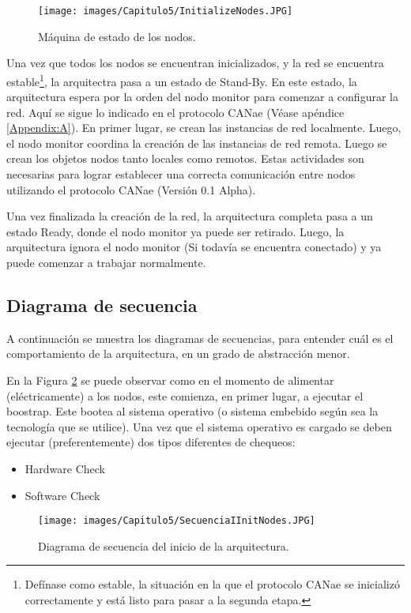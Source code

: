\begin{figure}[h!]
 \centering
 \texttt{[image: images/Capitulo5/InitializeNodes.JPG]}
  \caption{Máquina de estado de los nodos.}
\label{fig:StateMacineInitNodes}
\end{figure}

Una vez que todos los nodos se encuentran inicializados, y la red se encuentra
estable\footnote{Defínase como estable, la situación en la que el
  protocolo CANae se inicializó correctamente y está listo para pasar
  a la segunda etapa.}, la arquitectra pasa a un estado de Stand-By.
En este estado, la arquitectura espera por la orden del nodo monitor
para comenzar a configurar la red. Aquí se sigue lo indicado en el
protocolo CANae (Véase apéndice \ref{Appendix:A}). En primer lugar,
se crean las instancias de red localmente. Luego,  el nodo monitor
coordina la creación de las instancias de red remota. Luego se crean
los objetos nodos tanto locales como remotos. Estas actividades
son necesarias para lograr establecer una correcta comunicación
entre nodos utilizando el protocolo CANae (Versión 0.1 Alpha).

Una vez finalizada la creación de la red, la arquitectura completa
pasa a un estado Ready, donde el nodo monitor ya puede ser retirado.
Luego, la arquitectura ignora el nodo monitor (Si todavía se encuentra
conectado) y ya puede comenzar a trabajar normalmente.

\subsection{Diagrama de secuencia}
A continuación se muestra los diagramas de secuencias, para entender
cuál es el comportamiento de la arquitectura, en un grado
de abstracción menor.

En la Figura \ref{fig:SecInitArq} se puede observar como en
el momento de alimentar (eléctricamente) a los nodos, este comienza,
en primer lugar, a ejecutar el boostrap. Este bootea al
sistema operativo (o sistema embebido según sea la tecnología
que se utilice). Una vez que el sistema operativo es cargado se
deben ejecutar (preferentemente) dos tipos diferentes de chequeos:
\begin{itemize}
\item Hardware Check
\item Software Check
\end{itemize}

\begin{figure}[h!]
 \centering
 \texttt{[image: images/Capitulo5/SecuenciaIInitNodes.JPG]}
  \caption{Diagrama de secuencia del inicio de la arquitectura.}
\label{fig:SecInitArq}
\end{figure}

